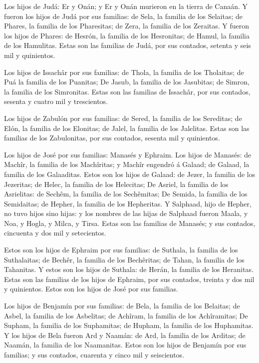  Los hijos de Judá: Er y Onán; y Er y Onán murieron en la
tierra de Canaán.  Y fueron los hijos de Judá por sus
familias: de Sela, la familia de los Selaitas; de Phares, la familia de
los Pharesitas; de Zera, la familia de los Zeraitas.  Y
fueron los hijos de Phares: de Hesrón, la familia de los Hesronitas; de
Hamul, la familia de los Hamulitas.  Estas son las
familias de Judá, por sus contados, setenta y seis mil y quinientos.

 Los hijos de Issachâr por sus familias: de Thola, la
familia de los Tholaitas; de Puá la familia de los Puanitas;
 De Jasub, la familia de los Jasubitas; de Simron, la
familia de los Simronitas.  Estas son las familias de
Issachâr, por sus contados, sesenta y cuatro mil y trescientos.

 Los hijos de Zabulón por sus familias: de Sered, la
familia de los Sereditas; de Elón, la familia de los Elonitas; de Jalel,
la familia de los Jalelitas.  Estas son las familias de
los Zabulonitas, por sus contados, sesenta mil y quinientos.

 Los hijos de José por sus familias: Manasés y Ephraim.
 Los hijos de Manasés: de Machîr, la familia de los
Machîritas; y Machîr engendró á Galaad; de Galaad, la familia de los
Galaaditas.  Estos son los hijos de Galaad: de Jezer, la
familia de los Jezeritas; de Helec, la familia de los Helecitas;
 De Asriel, la familia de los Asrielitas: de Sechêm, la
familia de los Sechêmitas;  De Semida, la familia de los
Semidaitas; de Hepher, la familia de los Hepheritas.  Y
Salphaad, hijo de Hepher, no tuvo hijos sino hijas: y los nombres de las
hijas de Salphaad fueron Maala, y Noa, y Hogla, y Milca, y Tirsa.
 Estas son las familias de Manasés; y sus contados,
cincuenta y dos mil y setecientos.

 Estos son los hijos de Ephraim por sus familias: de
Suthala, la familia de los Suthalaitas; de Bechêr, la familia de los
Bechêritas; de Tahan, la familia de los Tahanitas.  Y
estos son los hijos de Suthala: de Herán, la familia de los Heranitas.
 Estas son las familias de los hijos de Ephraim, por sus
contados, treinta y dos mil y quinientos. Estos son los hijos de José
por sus familias.

 Los hijos de Benjamín por sus familias: de Bela, la
familia de los Belaitas; de Asbel, la familia de los Asbelitas; de
Achîram, la familia de los Achîramitas;  De Supham, la
familia de los Suphamitas; de Hupham, la familia de los Huphamitas.
 Y los hijos de Bela fueron Ard y Naamán: de Ard, la
familia de los Arditas; de Naamán, la familia de los Naamanitas.
 Estos son los hijos de Benjamín por sus familias; y sus
contados, cuarenta y cinco mil y seiscientos.

